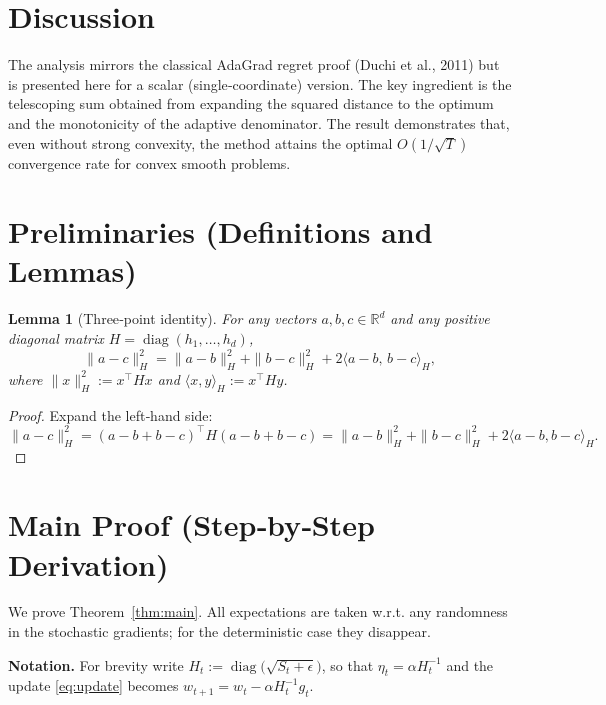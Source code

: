 \documentclass{article}
\newtheorem{lemma}{Lemma}
\newcommand{\R}{\mathbb{R}}
\begin{document}
\section*{Discussion}
The analysis mirrors the classical AdaGrad regret proof (Duchi et al.,
2011) but is presented here for a scalar (single‑coordinate) version.
The key ingredient is the telescoping sum obtained from expanding the
squared distance to the optimum and the monotonicity of the adaptive
denominator. The result demonstrates that, even without strong convexity,
the method attains the optimal $O(1/\sqrt{T})$ convergence rate for convex
smooth problems.

\newpage

\section*{Preliminaries (Definitions and Lemmas)}
\begin{lemma}[Three‑point identity]\label{lem:three}
For any vectors $a,b,c\in\R^d$ and any positive diagonal matrix
$H=\operatorname{diag}(h_1,\dots,h_d)$,
\[
    \|a-c\|_H^2 = \|a-b\|_H^2 + \|b-c\|_H^2
               +2\langle a-b,\,b-c\rangle_H,
\]
where $\|x\|_H^2:=x^{\!\top}Hx$ and $\langle x,y\rangle_H:=x^{\!\top}Hy$.
\end{lemma}
\begin{proof}
Expand the left‑hand side:
\[
\|a-c\|_H^2=(a-b+b-c)^{\!\top}H(a-b+b-c)
           =\|a-b\|_H^2+\|b-c\|_H^2+2\langle a-b,b-c\rangle_H .
\]
\end{proof}

\section*{Main Proof (Step‑by‑Step Derivation)}
We prove Theorem~\ref{thm:main}.  
All expectations are taken w.r.t. any randomness in the stochastic
gradients; for the deterministic case they disappear.

\noindent\textbf{Notation.}
For brevity write $H_t:=\operatorname{diag}\bigl(\sqrt{S_{t}+\epsilon}\bigr)$,
so that $\eta_{t}= \alpha H_t^{-1}$ and the update \eqref{eq:update}
becomes $w_{t+1}=w_t-\alpha H_t^{-1} g_t$.
\end{document}
